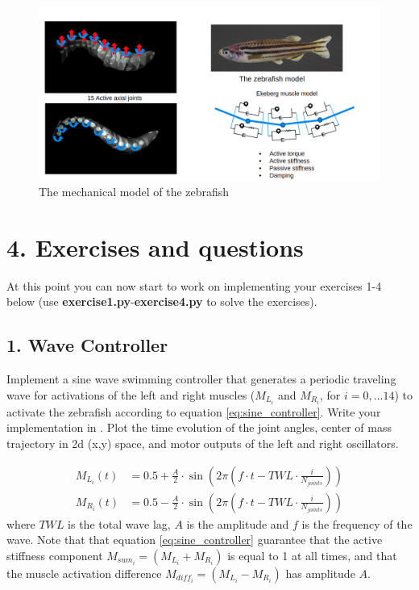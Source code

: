 \documentclass{cmc}
\begin{document}
\begin{figure}[ht]
  \centering \includegraphics[width=1.0\textwidth]{figures/mechanical.png}
  \caption{\label{fig:mechanical} The mechanical model of the zebrafish}
\end{figure}

\newpage






\newpage
\section*{4. Exercises and questions}
At this point you can now start to work on implementing your exercises 1-4 below (use \textbf{exercise1.py}-\textbf{exercise4.py} to solve the exercises).

\subsection*{1. Wave Controller} \label{subsec:wavecontroller}
Implement a sine wave swimming controller that generates a periodic traveling wave for activations of the left and right muscles ($M_{L_i}$ and $M_{R_i}$, for $i=0,...14$) to activate the zebrafish according to equation \ref{eq:sine_controller}. Write your implementation in . Plot the time evolution of the joint angles, center of mass trajectory in 2d (x,y) space, and motor outputs of the left and right oscillators.

\begin{eqnarray}
  \label{eq:sine_controller}
M_{L_i} (t)&=0.5 + \frac{A}{2} \cdot \sin \left( 2 \pi \left( f \cdot t - TWL \cdot \frac{i}{N_{joints}} \right) \right)  \nonumber \\
M_{R_i} (t)&=0.5 - \frac{A}{2} \cdot \sin \left( 2 \pi \left( f \cdot t - TWL \cdot \frac{i}{N_{joints}} \right) \right)
\end{eqnarray}
where $TWL$ is the total wave lag, $A$ is the amplitude and $f$ is the frequency of the wave. Note that that equation \ref{eq:sine_controller} guarantee that the active stiffness component $M_{sum_i} = (M_{L_i} + M_{R_i})$ is equal to 1 at all times, and that the muscle activation difference $M_{diff_i} = (M_{L_i} - M_{R_i})$ has amplitude $A$.
\end{document}
